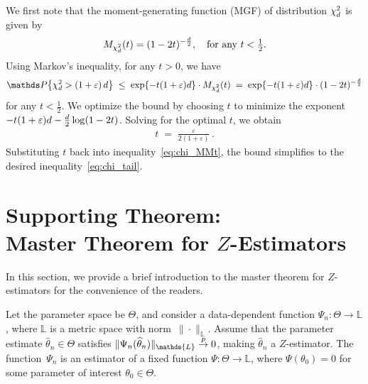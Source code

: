 	We first note that the moment-generating function (MGF) of distribution $\chi^2_{d}$ is given by
	\begin{align*}
		M_{\chi^2_{d}}(t) = (1 - 2t)^{-\frac{d}{2}}, \quad \mbox{for any $t < \frac{1}{2}$}.
	\end{align*}
	Using Markov’s inequality, for any $t > 0$, we have
	\begin{align}
		\label{eq:chi_MMt}
		\Prob\big\{\chisquare_{\Dim} > (1 + \varepsilon) \, \Dim\big\}
		\;\leq\; \exp\{-t(1 + \varepsilon)\Dim\} \cdot \MMt(t)
		\; = \; \exp\{-t(1 + \varepsilon)\Dim\} \cdot (1 - 2t)^{-\frac{\Dim}{2}}
	\end{align}
    for any $t < \frac{1}{2}$.
	We optimize the bound by choosing $t$ to minimize the exponent $-t(1 + \varepsilon)d - \frac{d}{2}\log(1 - 2t)$.
	Solving for the optimal $t$, we obtain
	\begin{align*}
		t \; = \; \frac{\varepsilon}{2(1 + \varepsilon)} \, .
	\end{align*}
	Substituting $t$ back into inequality~\eqref{eq:chi_MMt}, the bound simplifies to the desired inequality~\eqref{eq:chi_tail}.
	

	
	

	\section{Supporting Theorem: \\ Master Theorem for $Z$-Estimators}
	\label{sec:master}
	
	In this section, we provide a brief introduction to the master theorem for $Z$-estimators for the convenience of the readers.
	
	Let the parameter space be $\Theta$, and consider a data-dependent function $\Psi_n: \Theta \to \mathds{L}$, where $\mathds{L}$ is a metric space with norm~$\|\cdot\|_{\mathds{L}}$. Assume that the parameter estimate $\widehat{\theta}_n \in \Theta$ satisfies $\|\Psi_n(\widehat{\theta}_n)\|_{\mathds{L}} \convergep 0$, making $\widehat{\theta}_n$ a $Z$-estimator. The function~$\Psi_n$ is an estimator of a fixed function $\Psi: \Theta \to \mathds{L}$, where $\Psi(\theta_0) = 0$ for some parameter of interest $\theta_0 \in \Theta$.
	
